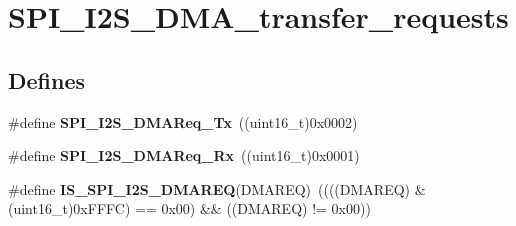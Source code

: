 \hypertarget{group__SPI__I2S__DMA__transfer__requests}{
\section{SPI\_\-I2S\_\-DMA\_\-transfer\_\-requests}
\label{group__SPI__I2S__DMA__transfer__requests}
}
\subsection*{Defines}
\begin{DoxyCompactItemize}
\item 
\hypertarget{group__SPI__I2S__DMA__transfer__requests_ga05f55a18c83aaa945d99200d012e5e2a}{
\#define {\bfseries SPI\_\-I2S\_\-DMAReq\_\-Tx}~((uint16\_\-t)0x0002)}
\label{group__SPI__I2S__DMA__transfer__requests_ga05f55a18c83aaa945d99200d012e5e2a}

\item 
\hypertarget{group__SPI__I2S__DMA__transfer__requests_gaa7f680295cdc1af9b086bf51312f15f3}{
\#define {\bfseries SPI\_\-I2S\_\-DMAReq\_\-Rx}~((uint16\_\-t)0x0001)}
\label{group__SPI__I2S__DMA__transfer__requests_gaa7f680295cdc1af9b086bf51312f15f3}

\item 
\hypertarget{group__SPI__I2S__DMA__transfer__requests_ga6a8f97093494f2331dbdf9295d7c2c6b}{
\#define {\bfseries IS\_\-SPI\_\-I2S\_\-DMAREQ}(DMAREQ)~((((DMAREQ) \& (uint16\_\-t)0xFFFC) == 0x00) \&\& ((DMAREQ) != 0x00))}
\label{group__SPI__I2S__DMA__transfer__requests_ga6a8f97093494f2331dbdf9295d7c2c6b}

\end{DoxyCompactItemize}
